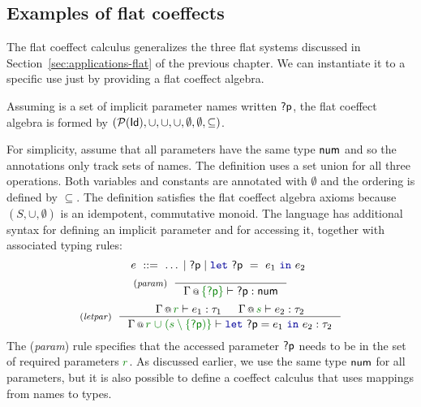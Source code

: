 
\subsection{Examples of flat coeffects}
\label{sec:flat-calculus-examples}

The flat coeffect calculus generalizes the three flat systems discussed in
Section~\ref{sec:applications-flat} of the previous chapter. We can instantiate it to a specific
use just by providing a flat coeffect algebra.

\begin{example}
\label{ex:flat-impl}
Assuming  is a set of implicit parameter names written $\textnormal{\sffamily ?p}$, the flat coeffect
algebra is formed by $(\mathcal{P}(\textnormal{\sffamily Id}), \cup, \cup, \cup, \emptyset, \emptyset, \subseteq)$.
\end{example}

\noindent
For simplicity, assume that all parameters have the same type $\textnormal{\sffamily num}$ and so the annotations only
track sets of names. The definition uses a set union for all three operations. Both variables and
constants are annotated with $\emptyset$ and the ordering is defined by $\subseteq$. The
definition satisfies the flat coeffect algebra axioms because $(S, \cup, \emptyset)$ is an idempotent,
commutative monoid. The language has additional syntax for defining an implicit parameter and for
accessing it, together with associated typing rules:
%
\begin{equation*}
\quad~ e ~::=~ \ldots \sep \ident{?p} \sep \kvd{let}~\ident{?p}~=~e_1~\kvd{in}~e_2
\end{equation*}
\begin{equation*}
\tyrule{param}
  { ~ }
  { \coctx{\Gamma}{\cclrd{ \{ \ident{?p} \} }} \vdash \ident{?p} : \ident{num} }
\end{equation*}
\begin{equation*}
\tyrule{letpar}
  { \coctx{\Gamma}{\cclrd{r}} \vdash e_1 : \tau_1 &
    \coctx{\Gamma}{\cclrd{s}} \vdash e_2 : \tau_2}
  {\coctx{\Gamma}{\cclrd{r} \;\cclrd{\cup\; (\cclrd{s} \setminus \{ \ident{?p}) \}} } \vdash \kvd{let}~\ident{?p}=e_1~\kvd{in}~e_2 : \tau_2 }
\end{equation*}
%
The (\emph{param}) rule specifies that the accessed parameter $\textnormal{\sffamily ?p}$ needs to be in the set of
required parameters $\cclrd{r}$. As discussed earlier, we use the same type $\textnormal{\sffamily num}$ for all
parameters, but it is also possible to define a coeffect calculus that uses mappings from names to
types.


